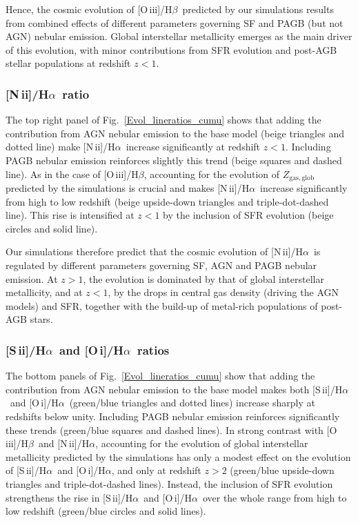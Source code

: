 \documentclass[fleqn,usenatbib]{mnras}
\newcommand{\oiiihb}{\hbox{[O\,{\sc iii}]/H$\beta$}}
\newcommand{\niiha}{\hbox{[N\,{\sc ii}]/H$\alpha$}}
\newcommand{\siiha}{\hbox{[S\,{\sc ii}]/H$\alpha$}}
\newcommand{\oiha}{\hbox{[O\,{\sc i}]/H$\alpha$}}
\begin{document}
Hence, the cosmic evolution of \oiiihb\ predicted by our simulations
results  from combined effects of different parameters governing SF
and PAGB (but not AGN) nebular emission. Global interstellar
metallicity emerges as the main driver of this evolution, with minor
contributions from SFR evolution and post-AGB  stellar populations at
redshift $z<1$. 
 
\subsubsection{\niiha\ ratio}

The top right panel of Fig.~\ref{Evol_lineratios_cumu} shows that
adding the contribution from AGN nebular emission to the base model
(beige triangles and dotted line) make \niiha\ increase significantly
at redshift $z<1$. Including PAGB nebular emission reinforces slightly
this trend (beige squares and dashed line). As in the case of \oiiihb,
accounting for the evolution of $Z_\mathrm{gas,glob}$ predicted by the
simulations is crucial and makes \niiha\ increase significantly from
high to low redshift (beige upside-down triangles and
triple-dot-dashed line). This rise  is intensified at $z<1$ by the
inclusion of SFR evolution (beige circles and solid line). 

Our simulations therefore predict that the cosmic evolution of \niiha\ 
is regulated by different parameters governing SF, AGN and PAGB
nebular emission. At $z>1$, the evolution is dominated by that of 
global interstellar metallicity, and at $z<1$, by the drops in central
gas density (driving the AGN models) and SFR, together with the
build-up of metal-rich  populations of post-AGB stars.

\subsubsection{\siiha\ and \oiha\ ratios}

The bottom panels of Fig.~\ref{Evol_lineratios_cumu} show that adding
the contribution from AGN nebular emission to the base model makes
both \siiha\ and \oiha\ (green/blue triangles and dotted lines)
increase sharply at redshifts below unity. Including PAGB nebular
emission reinforces  significantly these trends (green/blue squares
and dashed lines). In strong contrast with \oiiihb\ and \niiha,
accounting for the evolution of global interstellar metallicity
predicted by the simulations has only a modest effect on the evolution
of \siiha\ and \oiha, and only at redshift $z>2$ (green/blue
upside-down triangles and triple-dot-dashed lines). Instead, the
inclusion of  SFR evolution strengthens the rise in \siiha\ and \oiha\
over the whole  range from high to low redshift (green/blue circles
and solid lines). 
\end{document}
